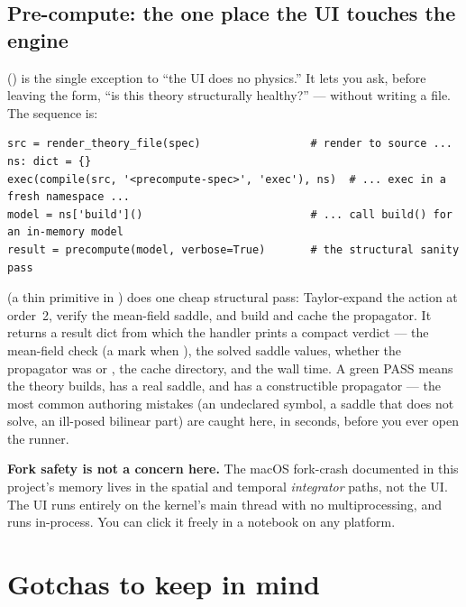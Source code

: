 \subsection{Pre-compute: the one place the UI touches the engine}

 () is the single exception
to ``the UI does no physics.'' It lets you ask, before leaving the form, ``is this
theory structurally healthy?'' --- without writing a file. The sequence is:

\begin{lstlisting}
src = render_theory_file(spec)                 # render to source ...
ns: dict = {}
exec(compile(src, '<precompute-spec>', 'exec'), ns)  # ... exec in a fresh namespace ...
model = ns['build']()                          # ... call build() for an in-memory model
result = precompute(model, verbose=True)       # the structural sanity pass
\end{lstlisting}

 (a thin primitive in
) does one cheap structural pass: Taylor-expand the
action at order~2, verify the mean-field saddle, and build and cache the
propagator. It returns a result dict from which the handler prints a compact
verdict --- the mean-field check (a  mark when ),
the solved saddle values, whether the propagator was  or
, the cache directory, and the wall time. A green PASS means the
theory builds, has a real saddle, and has a constructible propagator --- the most
common authoring mistakes (an undeclared symbol, a saddle that does not solve, an
ill-posed bilinear part) are caught here, in seconds, before you ever open the
runner.

\begin{gotcha}
\textbf{Fork safety is not a concern here.} The macOS fork-crash documented in this
project's memory lives in the spatial and temporal \emph{integrator} paths, not the
UI. The UI runs entirely on the kernel's main thread with no multiprocessing, and
 runs  in-process. You can click it freely in a
notebook on any platform.
\end{gotcha}

\section{Gotchas to keep in mind}

